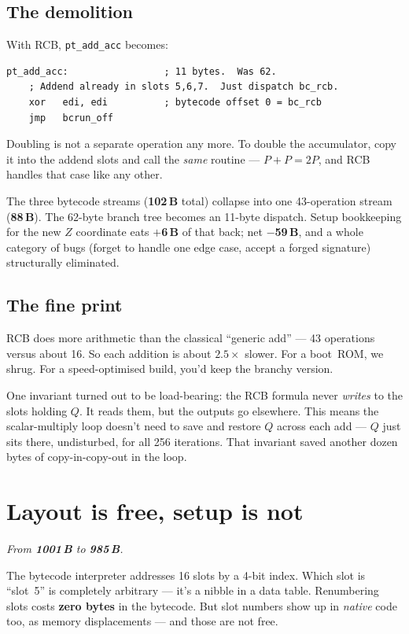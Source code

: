\documentclass[11pt,a4paper]{article}
\newcommand{\bytes}[1]{\textcolor{blue!60!black}{\textbf{#1\,B}}}
\newcommand{\saved}[1]{\textcolor{green!50!black}{\textbf{$-$#1\,B}}}
\newcommand{\spent}[1]{\textcolor{red!70!black}{\textbf{$+$#1\,B}}}
\begin{document}
\subsection{The demolition}

With RCB, \texttt{pt\_add\_acc} becomes:
\begin{lstlisting}[language={[x86masm]Assembler}]
pt_add_acc:                 ; 11 bytes.  Was 62.
    ; Addend already in slots 5,6,7.  Just dispatch bc_rcb.
    xor   edi, edi          ; bytecode offset 0 = bc_rcb
    jmp   bcrun_off
\end{lstlisting}
Doubling is not a separate operation any more. To double the
accumulator, copy it into the addend slots and call the \emph{same}
routine --- $P + P = 2P$, and RCB handles that case like any other.

The three bytecode streams (\bytes{102} total) collapse into one
43-operation stream (\bytes{88}). The 62-byte branch tree becomes
an 11-byte dispatch. Setup bookkeeping for the new $Z$ coordinate
eats \spent{6} of that back; net \saved{59}, and a whole category
of bugs (forget to handle one edge case, accept a forged
signature) structurally eliminated.

\subsection{The fine print}

RCB does more arithmetic than the classical ``generic add'' --- 43
operations versus about 16. So each addition is about $2.5\times$
slower. For a boot~ROM, we shrug. For a speed-optimised build, you'd
keep the branchy version.

One invariant turned out to be load-bearing: the RCB formula never
\emph{writes} to the slots holding $Q$. It reads them, but the
outputs go elsewhere. This means the scalar-multiply loop doesn't
need to save and restore $Q$ across each add --- $Q$ just sits there,
undisturbed, for all 256 iterations. That invariant saved another
dozen bytes of copy-in-copy-out in the loop.

\section{Layout is free, setup is not}
\label{sec:slotshift}

\noindent\emph{From \bytes{1001} to \bytes{985}.}

The bytecode interpreter addresses 16 slots by a 4-bit index. Which
slot is ``slot~5'' is completely arbitrary --- it's a nibble in a
data table. Renumbering slots costs \textbf{zero bytes} in the
bytecode. But slot numbers show up in \emph{native} code too, as
memory displacements --- and those are not free.
\end{document}
